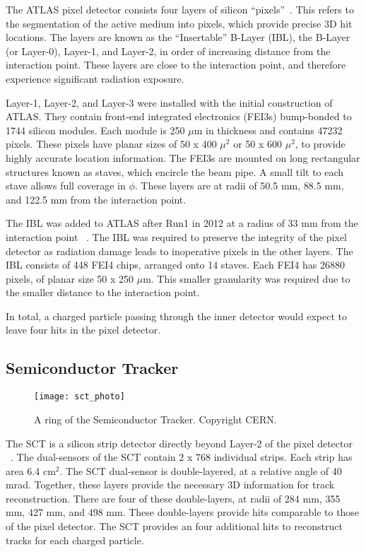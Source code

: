 The ATLAS pixel detector consists four layers of silicon ``pixels''~\cite{Aad:2008zz}.
This refers to the segmentation of the active medium into pixels, which provide precise 3D hit locations.
The layers are known as the ``Insertable'' B-Layer (IBL), the B-Layer (or Layer-0), Layer-1, and Layer-2, in order of increasing distance from the interaction point.
These layers are close to the interaction point, and therefore experience significant radiation exposure.

Layer-1, Layer-2, and Layer-3 were installed with the initial construction of ATLAS.
They contain front-end integrated electronics (FEI3s) bump-bonded to 1744 silicon modules.
Each module is 250 $\mu$m in thickness and contains 47232 pixels.
These pixels have planar sizes of 50 x 400 $\mu^2$ or  50 x 600 $\mu^2$, to provide highly accurate location information.
The FEI3s are mounted on long rectangular structures known as staves, which encircle the beam pipe.
A small tilt to each stave allows full coverage in $\phi$.
These layers are at radii of 50.5 mm, 88.5 mm, and 122.5 mm from the interaction point.

The IBL was added to ATLAS after Run1 in 2012 at a radius of 33 mm from the interaction point ~\cite{B-layerRef}.
The IBL was required to preserve the integrity of the pixel detector as radiation damage leads to inoperative pixels in the other layers.
The IBL consists of 448 FEI4 chips, arranged onto 14 staves.
Each FEI4 has 26880 pixels, of planar size 50 x 250 $\mu$m.
This smaller granularity was required due to the smaller distance to the interaction point.

In total, a charged particle passing through the inner detector would expect to leave four hits in the pixel detector.

\subsection{Semiconductor Tracker}
\begin{figure}[tbp]
\caption{A ring of the Semiconductor Tracker. Copyright CERN.} \label{fig:sct_photo}
\texttt{[image: sct\_photo]}
\end{figure}

The SCT is a silicon strip detector directly beyond Layer-2 of the pixel detector ~\cite{IDET-2013-01}.
The dual-sensors of the SCT contain 2 x 768 individual strips.
Each strip has area 6.4 cm$^2$.
The SCT dual-sensor is double-layered, at a relative angle of 40 mrad.
Together, these layers provide the necessary 3D information for track reconstruction.
There are four of these double-layers, at radii of 284 mm, 355 mm, 427 mm, and 498 mm.
These double-layers provide hits comparable to those of the pixel detector.
The SCT provides an four additional hits to reconstruct tracks for each charged particle.


